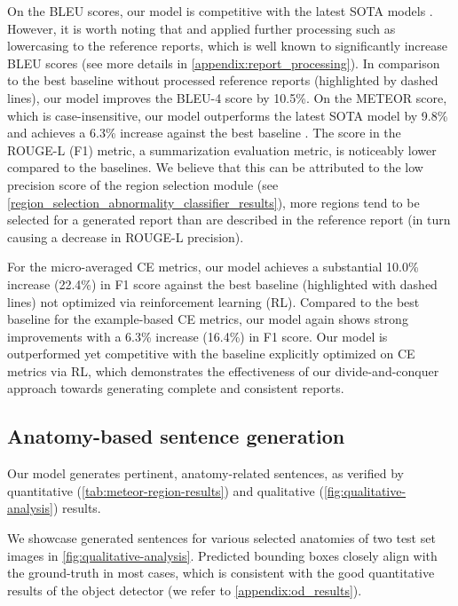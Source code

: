 \documentclass[10pt,twocolumn,letterpaper]{article}
\begin{document}
On the BLEU scores, our model is competitive with the latest SOTA models \cite{wang2022inclusive, nicolson2022improving}. However, it is worth noting that \cite{nicolson2022improving} and \cite{wang2022inclusive} applied further processing such as lowercasing to the reference reports, which is well known to significantly increase BLEU scores \cite{post2018call} (see more details in \cref{appendix:report_processing}). In comparison to the best baseline \cite{miura2021improving} without processed reference reports (highlighted by dashed lines), our model improves the BLEU-4 score by 10.5\%. On the METEOR score, which is case-insensitive, our model outperforms the latest SOTA model \cite{nicolson2022improving} by 9.8\% and achieves a 6.3\% increase against the best baseline \cite{you2021aligntransformer}. The score in the ROUGE-L (F1) metric, a summarization evaluation metric, is noticeably lower compared to the baselines. We believe that this can be attributed to the low precision score of the region selection module (see \cref{region_selection_abnormality_classifier_results}), \ie more regions tend to be selected for a generated report than are described in the reference report (in turn causing a decrease in ROUGE-L precision).

For the micro-averaged CE metrics, our model achieves a substantial 10.0\% increase (22.4\%) in F1 score against the best baseline \cite{miura2021improving} (highlighted with dashed lines) not optimized via reinforcement learning (RL). Compared to the best baseline for the example-based CE metrics, our model again shows strong improvements with a 6.3\% increase (16.4\%) in F1 score. Our model is outperformed yet competitive with the baseline \cite{miura2021improving} explicitly optimized on CE metrics via RL, which demonstrates the effectiveness of our divide-and-conquer approach towards generating complete and consistent reports. 

\subsection{Anatomy-based sentence generation}

Our model generates pertinent, anatomy-related sentences, as verified by quantitative (\cref{tab:meteor-region-results}) and qualitative (\cref{fig:qualitative-analysis}) results.

We showcase generated sentences for various selected anatomies of two test set images in \cref{fig:qualitative-analysis}. Predicted bounding boxes closely align with the ground-truth in most cases, which is consistent with the good quantitative results of the object detector (we refer to \cref{appendix:od_results}).
\end{document}
